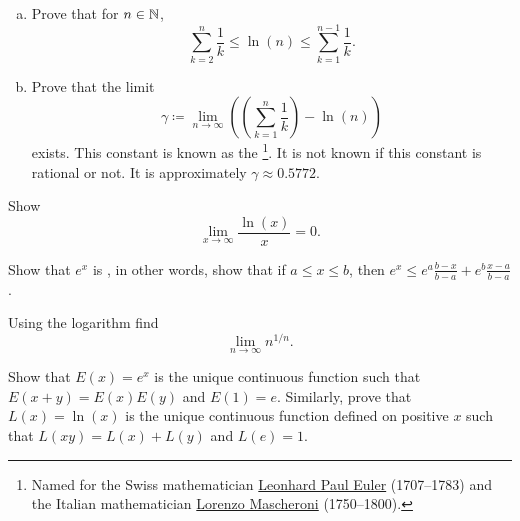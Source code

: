\begin{samepage}
\begin{exercise}
\leavevmode
\begin{enumerate}[a)]
\item
Prove that for $n \in {\mathbb{N}}$,
\begin{equation*}
\sum_{k=2}^{n}
\frac{1}{k}
\leq
\ln (n)
\leq
\sum_{k=1}^{n-1}
\frac{1}{k} .
\end{equation*}
\item
Prove that the limit
\begin{equation*}
\gamma \coloneqq \lim_{n\to\infty}
\left( \left( \sum_{k=1}^{n} \frac{1}{k} \right) - \ln (n) \right)
\end{equation*}
exists.  This constant is known as the
\emph{}%
\footnote{Named for the Swiss mathematician
\href{https://en.wikipedia.org/wiki/Leonhard_Euler}{Leonhard Paul Euler}
(1707--1783)
and the Italian mathematician
\href{https://en.wikipedia.org/wiki/Lorenzo_Mascheroni}{Lorenzo Mascheroni}
(1750--1800).}.  It is not known if this constant is rational or not.
It is approximately $\gamma \approx 0.5772$.
\end{enumerate}
\end{exercise}
\end{samepage}

\begin{exercise}
Show
\begin{equation*}
\lim_{x\to\infty} \frac{\ln(x)}{x} = 0 .
\end{equation*}
\end{exercise}

\begin{exercise}
Show that $e^x$ is \emph{}, in other words, show that 
if $a \leq x \leq b$, then
$e^x \leq e^a \frac{b-x}{b-a} + e^b \frac{x-a}{b-a}$.
\end{exercise}

\begin{exercise}
Using the logarithm find
\begin{equation*}
\lim_{n\to\infty} n^{1/n} .
\end{equation*}
\end{exercise}

\begin{exercise}
Show that $E(x) = e^x$ is the unique continuous function such that
$E(x+y) = E(x)E(y)$ and $E(1) = e$.   Similarly, prove that $L(x) = \ln(x)$
is the unique continuous
function defined on positive $x$ such that $L(xy) = L(x)+L(y)$
and $L(e) = 1$.
\end{exercise}


